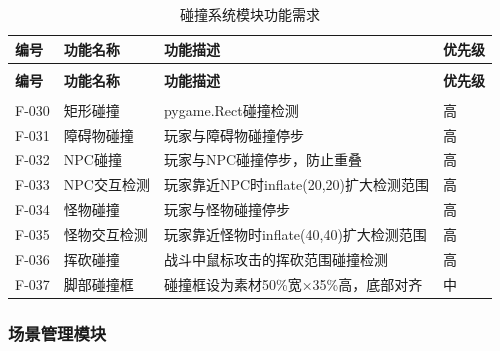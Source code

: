 \documentclass[12pt,a4paper]{article}
\begin{document}
\begin{longtable}{>{\centering\arraybackslash}m{1.5cm}>{\centering\arraybackslash}m{2.5cm}>{\centering\arraybackslash}m{6cm}>{\centering\arraybackslash}m{1.5cm}}
\caption{碰撞系统模块功能需求} \label{tab:f_col} \\
\toprule
\textbf{编号} & \textbf{功能名称} & \textbf{功能描述} & \textbf{优先级} \\
\midrule
\endfirsthead

\toprule
\multicolumn{4}{l}{续表} \\
\textbf{编号} & \textbf{功能名称} & \textbf{功能描述} & \textbf{优先级} \\
\midrule
\endhead

\midrule
\multicolumn{4}{r}{续下页} \\
\endfoot

\bottomrule
\endlastfoot

F-030 & 矩形碰撞 & pygame.Rect碰撞检测 & 高 \\
F-031 & 障碍物碰撞 & 玩家与障碍物碰撞停步 & 高 \\
F-032 & NPC碰撞 & 玩家与NPC碰撞停步，防止重叠 & 高 \\
F-033 & NPC交互检测 & 玩家靠近NPC时inflate(20,20)扩大检测范围 & 高 \\
F-034 & 怪物碰撞 & 玩家与怪物碰撞停步 & 高 \\
F-035 & 怪物交互检测 & 玩家靠近怪物时inflate(40,40)扩大检测范围 & 高 \\
F-036 & 挥砍碰撞 & 战斗中鼠标攻击的挥砍范围碰撞检测 & 高 \\
F-037 & 脚部碰撞框 & 碰撞框设为素材50\%宽×35\%高，底部对齐 & 中 \\
\end{longtable}

\subsubsection{场景管理模块}
\end{document}
